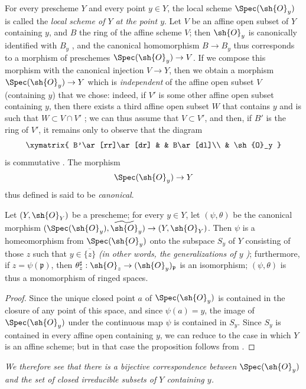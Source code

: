 For every prescheme $Y$ and every point $y\in Y$, the local scheme $\Spec(\sh{O}_y)$
is called the \emph{local scheme of $Y$ at the point $y$}.
Let $V$ be an affine open subset of $Y$ containing $y$, and $B$ the ring of the affine scheme $V$;
then $\sh{O}_y$ is canonically identified with $B_y$ , and the canonical homomorphism $B\to B_y$ thus corresponds  to a morphism of preschemes $\Spec(\sh{O}_y)\to V$.
If we compose this morphism with the canonical injection $V\to Y$, then we obtain a morphism $\Spec(\sh{O}_y)\to Y$ which is \emph{independent} of the affine open subset $V$ (containing $y$) that we chose: indeed, if $V'$ is some other affine open subset containing $y$, then there exists a third affine open subset $W$ that contains $y$ and is such that $W\subset V\cap V'$ ;
we can thus assume that $V\subset V'$, and then, if $B'$ is the ring of $V'$, it remains only to observe that the diagram
\[
  \xymatrix{
    B'\ar[rr]\ar[dr] & &
    B\ar[dl]\\
    & \sh{O}_y
  }
\]
is commutative .
The morphism
\[
  \Spec(\sh{O}_y)\to Y
\]
thus defined is said to be {\it canonical}.

\begin{proposition}[2.4.2]
\label{I.2.4.2}
Let $(Y,\sh{O}_Y)$ be a prescheme;
for every $y\in Y$, let $(\psi,\theta)$ be the canonical morphism $(\Spec(\sh{O}_y),\widetilde{\sh{O}}_y)\to(Y,\sh{O}_Y)$.
Then $\psi$ is a homeomorphism from $\Spec(\sh{O}_y)$ onto the subspace $S_y$ of $Y$ consisting of those $z$ such that $y\in\overline{\{z\}}$ \emph{(in other words, the \emph{generalizations} of $y$ )};
furthermore, if $z=\psi(\mathfrak{p})$, then $\theta_z^\sharp:\sh{O}_z\to(\sh{O}_y)_\mathfrak{p}$ is an isomorphism;
$(\psi,\theta)$ is thus a monomorphism of ringed spaces.
\end{proposition}

\begin{proof}
Since the unique closed point $a$ of $\Spec(\sh{O}_y)$ is contained in the closure of any point of this space, and since $\psi(a)=y$, the image of $\Spec(\sh{O}_y)$ under the continuous map $\psi$ is contained in $S_y$.
Since $S_y$ is contained in every affine open containing $y$, we can reduce to the case in which $Y$ is an affine scheme;
but in that case the proposition follows from .
\end{proof}

\emph{We therefore see  that there is a bijective correspondence between $\Spec(\sh{O}_y)$ and the set of closed irreducible subsets of $Y$ containing $y$.}


